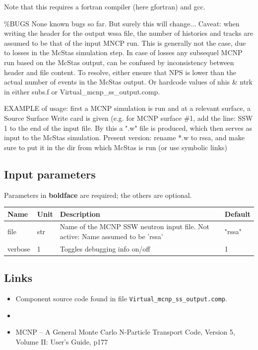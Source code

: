 Note that this requires a fortran compiler (here gfortran) and gcc.

\%BUGS None known bugs so far. But surely this will change... Caveat: when writing the header for the output wssa file, the number of histories and tracks are assumed to be that of the input MNCP run. This is generally not the case, due to losses in the McStas simulation step. In case of losses any subsequel MCNP run based on the McStas output, can be confused by inconsistency between header and file content. To resolve, either ensure that NPS is lower than the actual number of events in the McStas output. Or hardcode values of nhis \& ntrk in either subs.f or Virtual\_mcnp\_ss\_output.comp.

EXAMPLE of usage: first a MCNP simulation is run and at a relevant surface, a Source Surface Write card is given (e.g. for MCNP surface \#1, add the line: SSW 1 to the end of the input file. By this a ".w" file is produced, which then serves as input to the McStas simulation. Present version: rename *.w to rssa, and make sure to put it in the dir from which McStas is run (or use symbolic links)

\subsection*{Input parameters}
Parameters in \textbf{boldface} are required; the others are optional.

\begin{longtable}{p{}p{}p{}p{}}
\toprule
\textbf{Name} & \textbf{Unit} & \textbf{Description} & \textbf{Default} \\
\midrule
\endhead
file & str & Name of the MCNP SSW neutron input file. Not active: Name assumed to be 'rssa' & "rssa" \\
verbose & 1 & Toggles debugging info on/off & 1 \\
\bottomrule
\end{longtable}

\subsection*{Links}
\begin{itemize}
  \item Component source code found in file \texttt{Virtual\_mcnp\_ss\_output.comp}.
  \item {}
  \item MCNP -- A General Monte Carlo N-Particle Transport Code, Version 5, Volume II: User's Guide, p177
\end{itemize}
